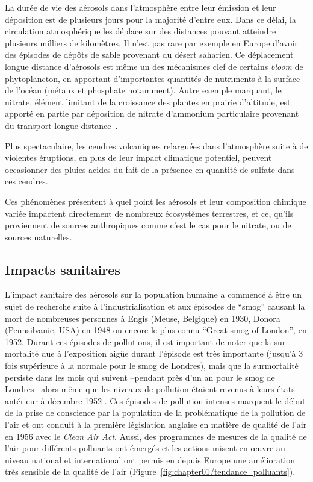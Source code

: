 La durée de vie des aérosols dans l'atmosphère entre leur émission et leur déposition est
de plusieurs jours pour la majorité d'entre eux. Dans ce délai, la circulation atmosphérique les déplace sur des
distances pouvant atteindre plusieurs milliers de kilomètres. Il n'est pas rare par exemple en
Europe d'avoir des épisodes de dépôts de sable provenant du désert saharien. Ce
déplacement longue distance d'aérosols est même un des mécanismes clef de certains
\textit{bloom}
de phytoplancton, en apportant d'importantes quantités de nutriments à la surface de l'océan 
(métaux et phosphate notamment).
Autre exemple marquant, le nitrate, élément limitant de la croissance des
plantes en prairie d'altitude, est apporté en partie par
déposition de nitrate d'ammonium particulaire provenant du transport longue
distance~\autocite{bourgeoisFoliar2019}.

Plus spectaculaire, les cendres volcaniques relarguées dans l'atmosphère suite à de
violentes éruptions, en plus de leur impact climatique potentiel, peuvent occasionner des
pluies acides du fait de la présence en quantité de sulfate dans ces cendres.

Ces phénomènes présentent à quel point les aérosols et leur composition chimique variée
impactent directement de nombreux écosystèmes terrestres, et ce, qu'ils proviennent de sources
anthropiques comme c'est le cas pour le nitrate, ou de sources naturelles.

\subsection{Impacts sanitaires}%
\label{sub:impacts_sanitaires}

L'impact sanitaire des aérosols sur la population humaine a commencé à être
un sujet de recherche suite à l'industrialisation et aux épisodes de ``smog'' causant la
mort de nombreuses personnes à Engis (Meuse, Belgique) en 1930, Donora (Pennsilvanie, USA)
en 1948 ou encore le plus connu ``Great smog of London'', en 1952. Durant ces épisodes de
pollutions, il est important de noter que la sur-mortalité due à l'exposition aigüe
durant l'épisode est très importante (jusqu'à 3 fois supérieure à la normale
pour le smog de Londres), mais que la surmortalité persiste dans les mois qui suivent
--pendant près d'un an pour le smog de Londres-- alors même que les niveaux de pollution
étaient revenus à leurs états antérieur à décembre 1952 \autocite{bellReassessment2001}.  Ces
épisodes de pollution intenses marquent le début de la prise de conscience par la
population de la problématique de la pollution de l'air et ont conduit à la première
législation anglaise en matière de qualité de l'air en 1956 avec le \textit{Clean Air
Act}. Aussi, des programmes de mesures de la qualité de l'air pour différents polluants
ont émergés et les actions misent en œuvre au niveau national et international ont permis
en depuis Europe une amélioration très sensible de la qualité de l'air
(Figure~\ref{fig:chapter01/tendance_polluants}).

